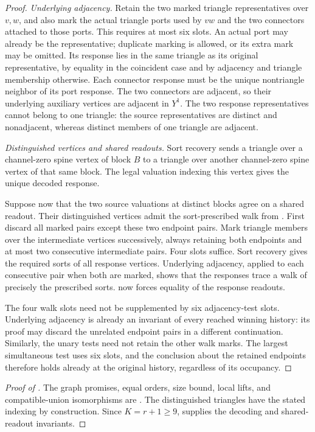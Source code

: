 \begin{proof}
\emph{Underlying adjacency.}
Retain the two marked triangle representatives over \(v,w\), and
also mark the actual triangle ports used by \(vw\) and the two
connectors attached to those ports.  This requires at most six slots.
An actual port may already be the representative; duplicate marking
is allowed, or its extra mark may be omitted.
Its response lies in the same triangle as its original
representative, by equality in the coincident case and by adjacency
and triangle membership otherwise.
Each connector response must be the unique nontriangle neighbor of
its port response.  The two connectors are adjacent, so their
underlying auxiliary vertices are adjacent in \(Y^1\).
The two response representatives cannot belong to one triangle:
the source representatives are distinct and nonadjacent, whereas
distinct members of one triangle are adjacent.

\emph{Distinguished vertices and shared readouts.}
Sort recovery sends a triangle over a channel-zero spine vertex
of block \(B\) to a triangle over another channel-zero spine vertex
of that same block.  The legal valuation indexing this vertex gives
the unique decoded response.

Suppose now that the two source valuations at distinct blocks agree
on a shared readout.
Their distinguished vertices admit the sort-prescribed walk from
.
First discard all marked pairs except these two endpoint pairs.
Mark triangle members over the intermediate vertices successively,
always retaining both endpoints and at most two consecutive
intermediate pairs.  Four slots suffice.
Sort recovery gives the required sorts of all response vertices.
Underlying adjacency, applied to each consecutive pair when both are
marked, shows that the responses trace a walk of precisely the
prescribed sorts.
 now forces equality of the response readouts.

The four walk slots need not be supplemented by six adjacency-test
slots.  Underlying adjacency is already an invariant of every reached
winning history: its proof may discard the unrelated endpoint pairs
in a different continuation.  Similarly, the unary tests need not
retain the other walk marks.
The largest simultaneous test uses six slots, and the conclusion
about the retained endpoints therefore holds already at the original
history, regardless of its occupancy.
\end{proof}

\begin{proof}[Proof of ]
The graph promises, equal orders, size bound, local lifts, and
compatible-union isomorphisms are
.
The distinguished triangles have the stated indexing by construction.
Since \(K=r+1\ge9\),  supplies the
decoding and shared-readout invariants.
\end{proof}


